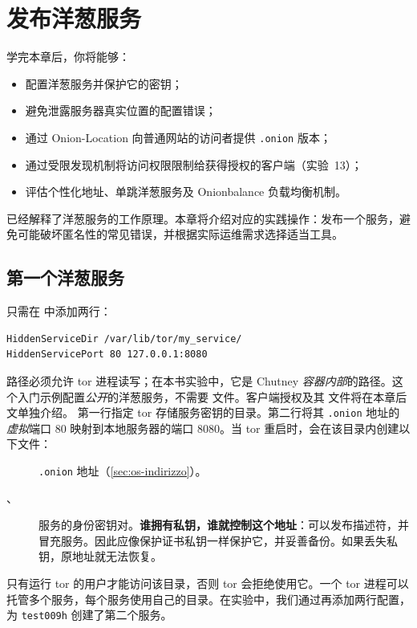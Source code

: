 \chapter{发布洋葱服务}\label{cap:21-onion-pratica}

\begin{obiettivi}
学完本章后，你将能够：
\begin{itemize}[nosep]
  \item 配置洋葱服务并保护它的密钥；
  \item 避免泄露服务器真实位置的配置错误；
  \item 通过 Onion-Location 向普通网站的访问者提供 \texttt{.onion} 版本；
  \item 通过受限发现机制将访问权限限制给获得授权的客户端（实验~13）；
  \item 评估个性化地址、单跳洋葱服务及 Onionbalance 负载均衡机制。
\end{itemize}
\end{obiettivi}

 已经解释了洋葱服务的工作原理。本章将介绍对应的实践操作：发布一个服务，避免可能破坏匿名性的常见错误，并根据实际运维需求选择适当工具。

\section{第一个洋葱服务}\label{sec:onionp-primo}

只需在  中添加两行：
\begin{lstlisting}[language=torrc]
HiddenServiceDir /var/lib/tor/my_service/
HiddenServicePort 80 127.0.0.1:8080
\end{lstlisting}
 路径必须允许 tor 进程读写；在本书实验中，它是 Chutney \emph{容器内部}的路径。这个入门示例配置\emph{公开}的洋葱服务，不需要  文件。客户端授权及其  文件将在本章后文单独介绍。
第一行指定 tor 存储服务密钥的目录。第二行将其 \texttt{.onion} 地址的\emph{虚拟}端口 80 映射到本地服务器的端口 8080。当 tor 重启时，会在该目录内创建以下文件：
\begin{description}
  \item[] \texttt{.onion} 地址（\cref{sec:os-indirizzo}）。
  \item[、] 服务的身份密钥对。\textbf{谁拥有私钥，谁就控制这个地址}：可以发布描述符，并冒充服务。因此应像保护证书私钥一样保护它，并妥善备份。如果丢失私钥，原地址就无法恢复。
\end{description}
只有运行 tor 的用户才能访问该目录，否则 tor 会拒绝使用它。一个 tor 进程可以托管多个服务，每个服务使用自己的目录。在实验中，我们通过再添加两行配置，为 \texttt{test009h} 创建了第二个服务。

